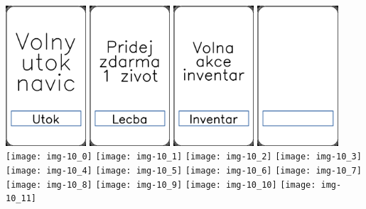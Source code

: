 \documentclass[a4paper]{article}
\begin{document}
	\includegraphics[width=3.0cm]{img-9_0}
	\includegraphics[width=3.0cm]{img-9_1}
	\includegraphics[width=3.0cm]{img-9_2}
	\includegraphics[width=3.0cm]{img-9_3}
	\texttt{[image: img-10\_0]}
	\texttt{[image: img-10\_1]}
	\texttt{[image: img-10\_2]}
	\texttt{[image: img-10\_3]}
	\texttt{[image: img-10\_4]}
	\texttt{[image: img-10\_5]}
	\texttt{[image: img-10\_6]}
	\texttt{[image: img-10\_7]}
	\texttt{[image: img-10\_8]}
	\texttt{[image: img-10\_9]}
	\texttt{[image: img-10\_10]}
	\texttt{[image: img-10\_11]}
\end{document}
